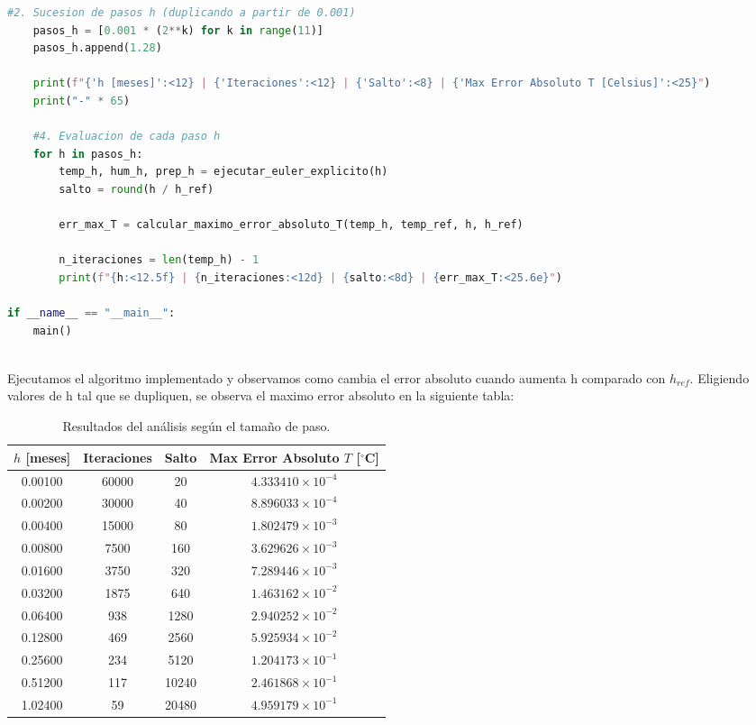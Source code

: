 \begin{lstlisting}[language=Python]
    #2. Sucesion de pasos h (duplicando a partir de 0.001)
    pasos_h = [0.001 * (2**k) for k in range(11)]
    pasos_h.append(1.28)

    print(f"{'h [meses]':<12} | {'Iteraciones':<12} | {'Salto':<8} | {'Max Error Absoluto T [Celsius]':<25}")
    print("-" * 65)

    #4. Evaluacion de cada paso h
    for h in pasos_h:
        temp_h, hum_h, prep_h = ejecutar_euler_explicito(h)
        salto = round(h / h_ref)
        
        err_max_T = calcular_maximo_error_absoluto_T(temp_h, temp_ref, h, h_ref)
        
        n_iteraciones = len(temp_h) - 1
        print(f"{h:<12.5f} | {n_iteraciones:<12d} | {salto:<8d} | {err_max_T:<25.6e}")

if __name__ == "__main__":
    main()
    
\end{lstlisting}

Ejecutamos el algoritmo implementado y observamos como cambia el error absoluto cuando aumenta h comparado con $h_{ref}$. Eligiendo valores de h tal que se dupliquen, se observa el maximo error absoluto en la siguiente tabla:

\begin{table}[htbp]
    \centering
    \caption{Resultados del análisis según el tamaño de paso.}
    \begin{tabular}{|c|c|c|c|}
        \hline 
        $h$ [meses] & Iteraciones & Salto & Max Error Absoluto $T$ [$^\circ$C] \\ \hline
        0.00100 & 60000 & 20    & $4.333410 \times 10^{-4}$ \\ \hline
        0.00200 & 30000 & 40    & $8.896033 \times 10^{-4}$ \\ \hline
        0.00400 & 15000 & 80    & $1.802479 \times 10^{-3}$ \\ \hline
        0.00800 & 7500  & 160   & $3.629626 \times 10^{-3}$ \\ \hline
        0.01600 & 3750  & 320   & $7.289446 \times 10^{-3}$ \\ \hline
        0.03200 & 1875  & 640   & $1.463162 \times 10^{-2}$ \\ \hline
        0.06400 & 938   & 1280  & $2.940252 \times 10^{-2}$ \\ \hline
        0.12800 & 469   & 2560  & $5.925934 \times 10^{-2}$ \\ \hline
        0.25600 & 234   & 5120  & $1.204173 \times 10^{-1}$ \\ \hline
        0.51200 & 117   & 10240 & $2.461868 \times 10^{-1}$ \\ \hline
        1.02400 & 59    & 20480 & $4.959179 \times 10^{-1}$ \\ \hline
\end{tabular}
\end{table}

